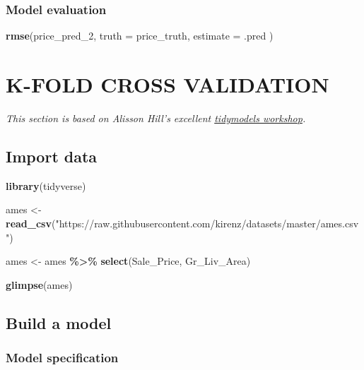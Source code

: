 \documentclass[
]{book}
\newenvironment{Shaded}{\begin{snugshade}}{\end{snugshade}}
\newcommand{\DataTypeTok}[1]{\textcolor[rgb]{0.13,0.29,0.53}{#1}}
\newcommand{\DecValTok}[1]{\textcolor[rgb]{0.00,0.00,0.81}{#1}}
\newcommand{\KeywordTok}[1]{\textcolor[rgb]{0.13,0.29,0.53}{\textbf{#1}}}
\newcommand{\NormalTok}[1]{#1}
\newcommand{\OperatorTok}[1]{\textcolor[rgb]{0.81,0.36,0.00}{\textbf{#1}}}
\newcommand{\StringTok}[1]{\textcolor[rgb]{0.31,0.60,0.02}{#1}}
\begin{document}
\hypertarget{model-evaluation-1}{%
\section{Model evaluation}\label{model-evaluation-1}}

\begin{Shaded}
\begin{Highlighting}[]
\KeywordTok{rmse}\NormalTok{(price\_pred\_}\DecValTok{2}\NormalTok{,}
  \DataTypeTok{truth =}\NormalTok{ price\_truth,}
  \DataTypeTok{estimate =}\NormalTok{ .pred}
\NormalTok{)}
\end{Highlighting}
\end{Shaded}

\hypertarget{part-k-fold-cross-validation}{%
\part{K-FOLD CROSS VALIDATION}\label{part-k-fold-cross-validation}}

\emph{This section is based on Alisson Hill's excellent \href{https://alison.rbind.io/tags/tidymodels/}{tidymodels workshop}.}

\hypertarget{import-data}{%
\chapter{Import data}\label{import-data}}

\begin{Shaded}
\begin{Highlighting}[]
\KeywordTok{library}\NormalTok{(tidyverse)}

\NormalTok{ames \textless{}{-}}\StringTok{ }\KeywordTok{read\_csv}\NormalTok{(}\StringTok{"https://raw.githubusercontent.com/kirenz/datasets/master/ames.csv"}\NormalTok{)}

\NormalTok{ames \textless{}{-}}
\StringTok{  }\NormalTok{ames }\OperatorTok{\%\textgreater{}\%}
\StringTok{  }\KeywordTok{select}\NormalTok{(Sale\_Price, Gr\_Liv\_Area)}

\KeywordTok{glimpse}\NormalTok{(ames)}
\end{Highlighting}
\end{Shaded}

\hypertarget{build-a-model}{%
\chapter{Build a model}\label{build-a-model}}

\hypertarget{model-specification}{%
\section{Model specification}\label{model-specification}}
\end{document}

